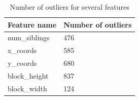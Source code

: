 \begin{table}[h]
\begin{center}
{\renewcommand{\arraystretch}{1.5}
\begin{tabular}{| p{5cm} | p{5cm}|}
\hline
\textbf{Feature name}	& \textbf{Number of outliers}\\
\hline
num\_siblings	& 476\\
\hline
x\_coords	& 585\\
\hline
y\_coords	& 680\\
\hline
block\_height	& 837\\
\hline
block\_width	& 124\\
\hline
\end{tabular}}
\caption{Number of outliers for several features}
\label{table:outlier}
\end{center}
\end{table}

